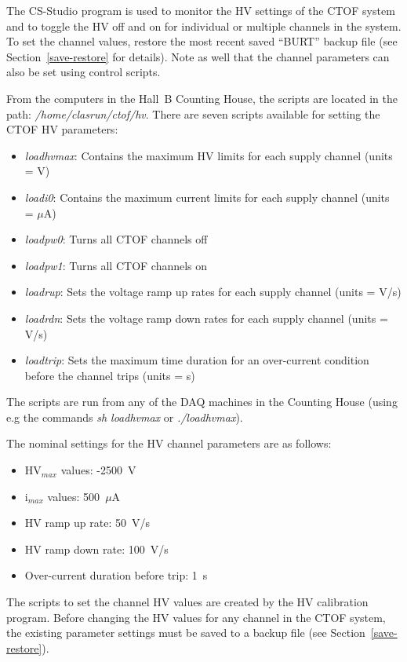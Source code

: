 \documentclass[12pt]{article}
\begin{document}
The CS-Studio program is used to monitor the HV settings of the CTOF system and to toggle the HV off and on
for individual or multiple channels in the system. To set the channel values, restore the most recent saved
``BURT'' backup file (see Section~\ref{save-restore} for details). Note as well that the channel parameters
can also be set using control scripts. 

From the computers in the Hall~B Counting House, the scripts are located in the path: {\it /home/clasrun/ctof/hv}.
There are seven scripts available for setting the CTOF HV parameters:

\begin{itemize}
\item {\it loadhvmax}: Contains the maximum HV limits for each supply channel (units = V)
\item {\it loadi0}: Contains the maximum current limits for each supply channel (units = $\mu$A)
\item {\it loadpw0}: Turns all CTOF channels off
\item {\it loadpw1}: Turns all CTOF channels on
\item {\it loadrup}: Sets the voltage ramp up rates for each supply channel (units = V/s)
\item {\it loadrdn}: Sets the voltage ramp down rates for each supply channel (units = V/s)
\item {\it loadtrip}: Sets the maximum time duration for an over-current condition before the channel trips
(units = s)
\end{itemize}

The scripts are run from any of the DAQ machines in the Counting House (using e.g the commands
{\it sh loadhvmax} or {\it ./loadhvmax}).

The nominal settings for the HV channel parameters are as follows:

\begin{itemize}
\item HV$_{max}$ values: -2500~V
\item i$_{max}$ values: 500~$\mu$A
\item HV ramp up rate: 50~V/s
\item HV ramp down rate: 100~V/s
\item Over-current duration before trip: 1~s
\end{itemize}

The scripts to set the channel HV values are created by the HV calibration program. Before changing the HV
values for any channel in the CTOF system, the existing parameter settings must be saved to a backup file
(see Section~\ref{save-restore}).
\end{document}
